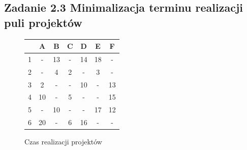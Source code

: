\subsection{Zadanie 2.3 Minimalizacja terminu realizacji puli projektów}
\begin{figure}[htb]
\caption{Czas realizacji projektów}
\begin{center}
\begin{tabular}{ | c | c | c | c | c | c | c | }
\hline
  & A & B & C & D & E & F \\ 
 \hline
 1 & - & 13 & - & 14 & 18 & - \\  
 \hline
 2 & - & 4 & 2 & - & 3 & - \\
 \hline  
 3 & 2 & - & - & 10 & - & 13 \\
 \hline  
 4 & 10 & - & 5 & - & - & 15 \\
 \hline  
 5 & - & 10 & - & - & 17 & 12 \\
 \hline  
 6 & 20 & - & 6 & 16 & - & - \\
 \hline
\end{tabular}
\end{center}
\end{figure}

